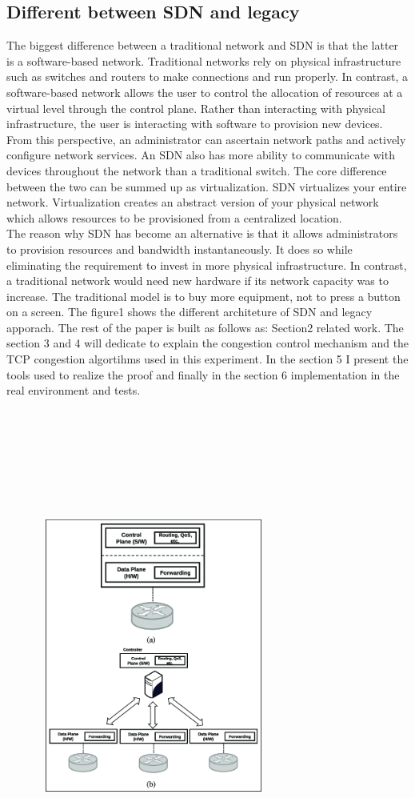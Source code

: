 {\subsection{\normalsize Different between SDN and legacy}{The biggest difference between a traditional network and SDN is that the latter is a software-based network. Traditional networks rely on physical infrastructure such as switches and routers to make connections and run properly. In contrast, a software-based network allows the user to control the allocation of resources at a virtual level through the control plane. Rather than interacting with physical infrastructure, the user is interacting with software to provision new devices.
\\
From this perspective, an administrator can ascertain network paths and actively configure network services. An SDN also has more ability to communicate with devices throughout the network than a traditional switch. The core difference between the two can be summed up as virtualization. SDN virtualizes your entire network. Virtualization creates an abstract version of your physical network which allows resources to be provisioned from a centralized location.
\\
The reason why SDN has become an alternative is that it allows administrators to provision resources and bandwidth instantaneously. It does so while eliminating the requirement to invest in more physical infrastructure. In contrast, a traditional network would need new hardware if its network capacity was to increase. The traditional model is to buy more equipment, not to press a button on a screen. The figure1 shows the different architeture of SDN and legacy apporach.
}
The rest of the paper is built as follows as:
Section2 related work. The section 3 and 4 will dedicate to explain the congestion control mechanism and the TCP congestion algortihms used in this experiment. In the section 5 I present the tools used to realize the proof and finally in the section 6 implementation in the real environment and tests.
\\\\\\\\\\\\\\\
\begin{figure}[!htb]
	\includegraphics[width=7.6cm,height=9.0cm]{figura1}

\end{figure}}
